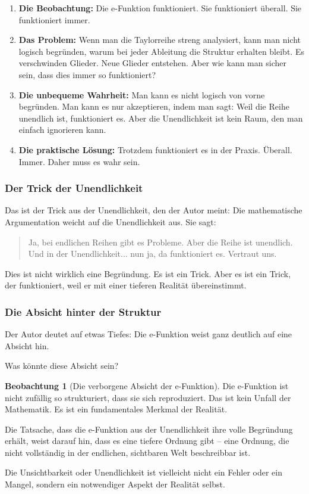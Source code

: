 \documentclass[a4paper,12pt,twoside]{report}
\theoremstyle{definition}
\newtheorem{beobachtung}{Beobachtung}
\begin{document}
\begin{enumerate}
	\item \textbf{Die Beobachtung:} Die e-Funktion funktioniert. Sie funktioniert überall. Sie funktioniert immer.
	
	\item \textbf{Das Problem:} Wenn man die Taylorreihe streng analysiert, kann man nicht logisch begründen, warum bei jeder Ableitung die Struktur erhalten bleibt. Es verschwinden Glieder. Neue Glieder entstehen. Aber wie kann man sicher sein, dass dies immer so funktioniert?
	
	\item \textbf{Die unbequeme Wahrheit:} Man kann es nicht logisch von vorne begründen. Man kann es nur akzeptieren, indem man sagt: Weil die Reihe unendlich ist, funktioniert es. Aber die Unendlichkeit ist kein Raum, den man einfach ignorieren kann.
	
	\item \textbf{Die praktische Lösung:} Trotzdem funktioniert es in der Praxis. Überall. Immer. Daher muss es wahr sein.
\end{enumerate}

\subsubsection*{Der Trick der Unendlichkeit}

Das ist der Trick aus der Unendlichkeit, den der Autor meint: Die mathematische Argumentation weicht auf die Unendlichkeit aus. Sie sagt:

\begin{quote}
Ja, bei endlichen Reihen gibt es Probleme. Aber die Reihe ist unendlich. Und in der Unendlichkeit... nun ja, da funktioniert es. Vertraut uns.
\end{quote}

Dies ist nicht wirklich eine Begründung. Es ist ein Trick. Aber es ist ein Trick, der funktioniert, weil er mit einer tieferen Realität übereinstimmt.

\subsubsection*{Die Absicht hinter der Struktur}

Der Autor deutet auf etwas Tiefes: Die e-Funktion weist ganz deutlich auf eine Absicht hin.

Was könnte diese Absicht sein?

\begin{beobachtung}[Die verborgene Absicht der e-Funktion]
	Die e-Funktion ist nicht zufällig so strukturiert, dass sie sich reproduziert. Das ist kein Unfall der Mathematik. Es ist ein fundamentales Merkmal der Realität.
	
	Die Tatsache, dass die e-Funktion aus der Unendlichkeit ihre volle Begründung erhält, weist darauf hin, dass es eine tiefere Ordnung gibt -- eine Ordnung, die nicht vollständig in der endlichen, sichtbaren Welt beschreibbar ist.
	
	Die Unsichtbarkeit oder Unendlichkeit ist vielleicht nicht ein Fehler oder ein Mangel, sondern ein notwendiger Aspekt der Realität selbst.
\end{beobachtung}
\end{document}
